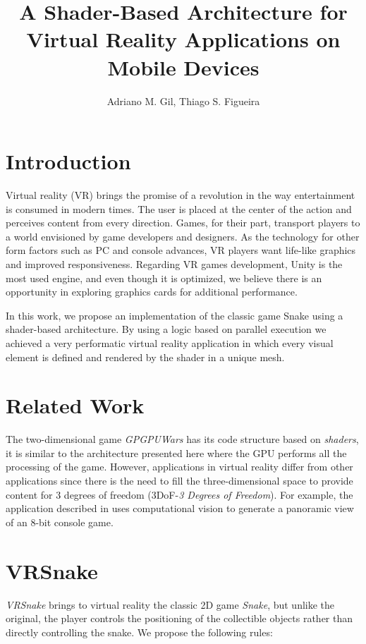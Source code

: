 \documentclass[12pt]{article}
\title{A Shader-Based Architecture for Virtual Reality Applications on Mobile Devices}
\author{Adriano M. Gil\inst{1}, Thiago S. Figueira\inst{1}}
\begin{document}
\maketitle

\smallskip

\section{Introduction}
Virtual reality (VR) brings the promise of a revolution in the way entertainment is consumed in modern times. The user is placed at the center of the action and perceives content from every direction. Games, for their part, transport players to a world envisioned by game developers and designers. As the technology for other form factors such as PC and console advances, VR players want life-like graphics and improved responsiveness. Regarding VR games development, Unity is the most used engine, and even though it is optimized, we believe there is an opportunity in exploring graphics cards for additional performance.

In this work, we propose an implementation of the classic game Snake using a shader-based architecture. By using a logic based on parallel execution we achieved a very performatic virtual reality application in which every visual element is defined and rendered by the shader in a unique mesh.

\section{Related Work}
The two-dimensional game \textit{GPGPUWars} \cite{joselli2009gpuwars} has its code structure based on \textit{shaders}, it is similar to the architecture presented here where the GPU performs all the processing of the game. However, applications in virtual reality differ from other applications since there is the need to fill the three-dimensional space to provide content for 3 degrees of freedom (3DoF-\textit{3 Degrees of Freedom}). For example, the application described in \cite{zund2015unfolding} uses computational vision to generate a panoramic view of an 8-bit console game.

\section{VRSnake} \label{sec:vrsnake}
\textit{VRSnake} brings to virtual reality the classic 2D game \textit{Snake}, but unlike the original, the player controls the positioning of the collectible objects rather than directly controlling the snake. We propose the following rules:
\end{document}
